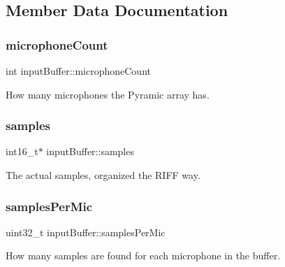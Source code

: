 \subsection{Member Data Documentation}
\hypertarget{structinputBuffer_a35bfb2e7cb4d0c0491f9efbe0273e455}{}\label{structinputBuffer_a35bfb2e7cb4d0c0491f9efbe0273e455} 
\subsubsection{\texorpdfstring{microphone\+Count}{microphoneCount}}
{\footnotesize\ttfamily int input\+Buffer\+::microphone\+Count}



How many microphones the Pyramic array has. 

\hypertarget{structinputBuffer_af6cdbaa4124d3e9db0272c19c94b2707}{}\label{structinputBuffer_af6cdbaa4124d3e9db0272c19c94b2707} 
\subsubsection{\texorpdfstring{samples}{samples}}
{\footnotesize\ttfamily int16\+\_\+t$\ast$ input\+Buffer\+::samples}



The actual samples, organized the R\+I\+FF way. 

\hypertarget{structinputBuffer_ab8b6a76bd2e891f34932e80268b66178}{}\label{structinputBuffer_ab8b6a76bd2e891f34932e80268b66178} 
\subsubsection{\texorpdfstring{samples\+Per\+Mic}{samplesPerMic}}
{\footnotesize\ttfamily uint32\+\_\+t input\+Buffer\+::samples\+Per\+Mic}



How many samples are found for each microphone in the buffer. 

\hypertarget{structinputBuffer_a37bcaba2336dc42b37c4362e30483129}{}\label{structinputBuffer_a37bcaba2336dc42b37c4362e30483129} 
